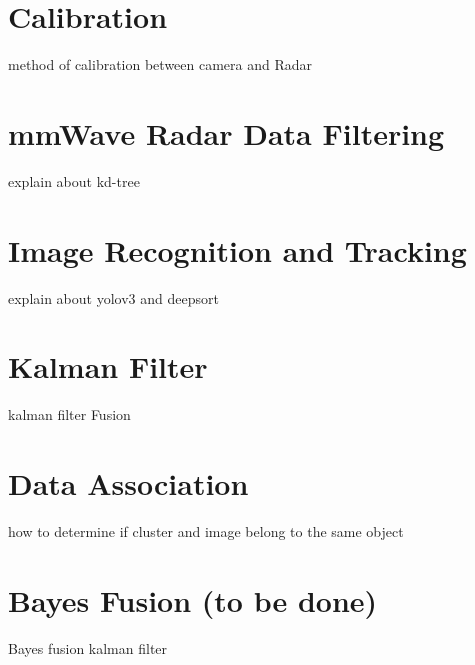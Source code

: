 \section{Calibration}\label{sec:calibration}
method of calibration between camera and Radar

\section{mmWave Radar Data Filtering}\label{sec:kd_tree}
explain about kd-tree

\section{Image Recognition and Tracking}\label{sec:img_recognition}
explain about yolov3 and deepsort

\section{Kalman Filter}\label{sec:kalman_filter}
kalman filter Fusion

\section{Data Association}\label{sec:association}
how to determine if cluster and image belong to the same object

\section{Bayes Fusion \small(to be done)}\label{sec:bayes_fusion}
Bayes fusion kalman filter 

